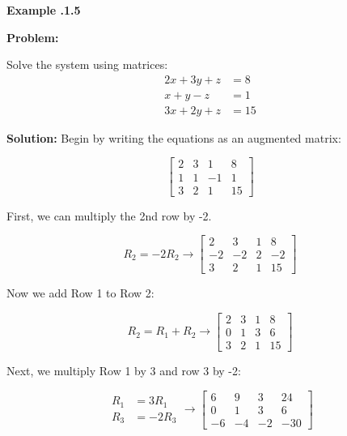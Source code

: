 \begin{mdframed}[backgroundcolor=blue!10!white]
	\begin{center}
		
		
		\textbf{Example \thesection.1.5}	
	\end{center}
	
	\textbf{Problem:}

	Solve the system using matrices:
\begin{equation*}
	\begin{aligned}
	2x + 3y + z &= 8 \\
	x + y - z &= 1 \\
	3x + 2y + z &= 15
\end{aligned}
\end{equation*}


\textbf{Solution:} Begin by writing the equations as an augmented matrix: 
\vspace{-0.2in}

	\begin{equation*}
\begin{bmatrix}
	2 & 3 & 1 & 8 \\
	1 & 1 & -1 & 1\\
	3 & 2 & 1 & 15 
\end{bmatrix} 		
	\end{equation*}

First, we can multiply the 2nd row by -2.

	\begin{equation*}
		R_2 = -2 R_2 \longrightarrow
	\begin{bmatrix}
		2 & 3 & 1 & 8 \\
		-2 & -2 & 2 & -2\\
		3 & 2 & 1 & 15 
	\end{bmatrix} 		
\end{equation*}

Now we add Row 1 to Row 2:

\begin{equation*}
	R_2 = R_1 + R_2 \longrightarrow
	\begin{bmatrix}
		2 & 3 & 1 & 8 \\
		0 & 1 & 3 & 6\\
		3 & 2 & 1 & 15 
	\end{bmatrix} 		
\end{equation*}

Next, we multiply Row 1 by 3 and row 3 by -2:

\begin{equation*}
	\begin{aligned}
		R_1 &= 3 R_1 \\
		R_3 &= -2 R_3
	\end{aligned}
	\longrightarrow
	\begin{bmatrix}
		6 & 9 & 3 & 24 \\
		0 & 1 & 3 & 6\\
		-6 & -4 & -2 & -30 
	\end{bmatrix} 		
\end{equation*}


\end{mdframed}
